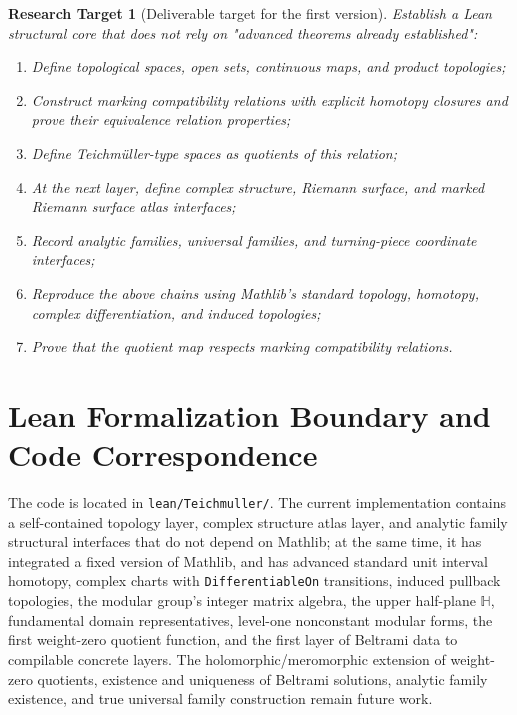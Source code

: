 \documentclass[UTF8,a4paper,11pt]{article}
\newtheorem{researchtarget}[definition]{Research Target}
\begin{document}
\begin{researchtarget}[Deliverable target for the first version]
Establish a Lean structural core that does not rely on "advanced theorems already established":
\begin{enumerate}[label=(\alph*)]
  \item Define topological spaces, open sets, continuous maps, and product topologies;
  \item Construct marking compatibility relations with explicit homotopy closures and prove their equivalence relation properties;
  \item Define Teichmüller-type spaces as quotients of this relation;
  \item At the next layer, define complex structure, Riemann surface, and marked Riemann surface atlas interfaces;
  \item Record analytic families, universal families, and turning-piece coordinate interfaces;
  \item Reproduce the above chains using Mathlib's standard topology, homotopy, complex differentiation, and induced topologies;
  \item Prove that the quotient map respects marking compatibility relations.
\end{enumerate}
\end{researchtarget}

\section{Lean Formalization Boundary and Code Correspondence}

The code is located in \texttt{lean/Teichmuller/}. The current implementation contains a self-contained topology layer, complex structure atlas layer, and analytic family structural interfaces that do not depend on Mathlib; at the same time, it has integrated a fixed version of Mathlib, and has advanced standard unit interval homotopy, complex charts with \texttt{DifferentiableOn} transitions, induced pullback topologies, the modular group's integer matrix algebra, the upper half-plane \(\mathbb H\), fundamental domain representatives, level-one nonconstant modular forms, the first weight-zero quotient function, and the first layer of Beltrami data to compilable concrete layers. The holomorphic/meromorphic extension of weight-zero quotients, existence and uniqueness of Beltrami solutions, analytic family existence, and true universal family construction remain future work.
\end{document}
